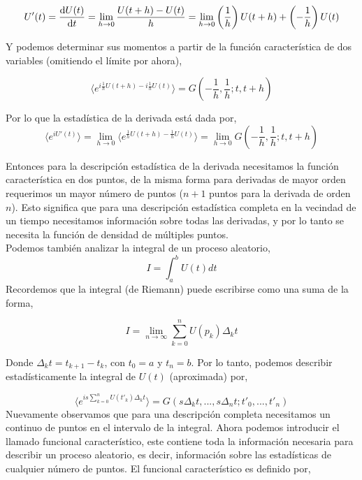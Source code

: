 \documentclass[executivepaper,12pt]{article}
\numberwithin{equation}{section}
\begin{document}
\begin{equation*}
	U'(t)=\dv{U(t)}{t}=\lim_{h\to 0}\frac{U(t+h)-U(t)}{h}=\lim_{h\to 0} \left(\frac{1}{h}\right)U(t+h) + \left(-\frac{1}{h}\right)U(t)
\end{equation*}

Y podemos determinar sus momentos a partir de la función característica de dos variables (omitiendo el límite por ahora),

\begin{equation}
	\langle e^{i\frac{1}{h}U(t+h)-i\frac{1}{h}U(t)} \rangle=G\left(-\frac{1}{h},\frac{1}{h};t,t+h\right)
\end{equation}

Por lo que la estadística de la derivada está dada por,
\begin{equation}
	\langle e^{iU'(t)} \rangle=\lim_{h\to 0}\langle e^{\frac{1}{h}U(t+h)-\frac{1}{h}U(t)} \rangle=\lim_{h\to 0} G\left(-\frac{1}{h},\frac{1}{h};t,t+h\right)
\end{equation}

Entonces para la descripción estadística de la derivada necesitamos la función característica en dos puntos, de la misma forma para derivadas de mayor orden requerimos un mayor número de puntos ($n+1$ puntos para la derivada de orden $n$). Esto significa que para una descripción estadística completa en la vecindad de un tiempo necesitamos información sobre todas las derivadas, y por lo tanto se necesita la función de densidad de múltiples puntos. \\
Podemos también analizar la integral de un proceso aleatorio, 
\begin{equation*}
	I=\int_{a}^{b} U(t) dt
\end{equation*}   
Recordemos que la integral (de Riemann) puede escribirse como una suma de la forma,

\begin{equation}
	I=\lim_{n\to\infty} \sum_{k=0}^{n} U(p_k) \Delta_k t
\end{equation}

Donde $\Delta_k t =t_{k+1}-t_k$, con $t_0=a$ y $t_n=b$. Por lo tanto, podemos describir estadísticamente la integral de $U(t)$ (aproximada) por,

\begin{equation*}
	\langle e^{is\sum_{k=0}^{n} U(t'_{k}) \Delta_k t} \rangle = G(s\Delta_k t,...,s\Delta_n t;t'_{0},...,t'_{n}) 
\end{equation*}
Nuevamente observamos que para una descripción completa necesitamos un continuo de puntos en el intervalo de la integral. Ahora podemos introducir el llamado funcional característico, este contiene toda la información necesaria para describir un proceso aleatorio, es decir, información sobre las estadísticas de cualquier número de puntos. El funcional característico es definido por,
\end{document}

